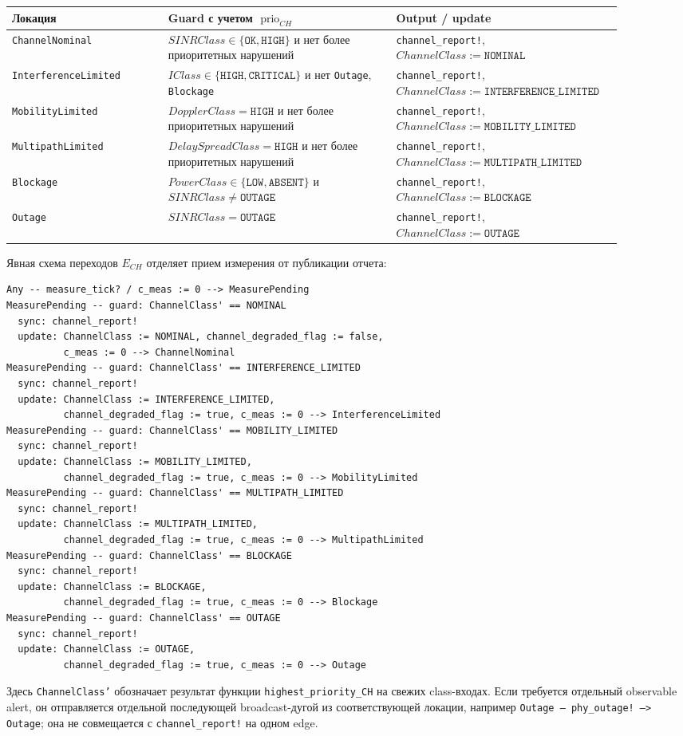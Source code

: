 \documentclass[10pt,a4paper]{article}
\newcommand{\code}[1]{\texttt{#1}}
\newcommand{\prio}{\operatorname{prio}}
\begin{document}
\begin{longtable}{|p{0.24\linewidth}|p{0.35\linewidth}|p{0.30\linewidth}|}
\hline
Локация & Guard с учетом \(\prio_{CH}\) & Output / update \\
\hline
\code{ChannelNominal} & \(SINRClass\in\{\code{OK},\code{HIGH}\}\) и нет более приоритетных нарушений & \code{channel\_report!}, \(ChannelClass:=\code{NOMINAL}\) \\
\hline
\code{InterferenceLimited} & \(IClass\in\{\code{HIGH},\code{CRITICAL}\}\) и нет \code{Outage}, \code{Blockage} & \code{channel\_report!}, \(ChannelClass:=\code{INTERFERENCE\_LIMITED}\) \\
\hline
\code{MobilityLimited} & \(DopplerClass=\code{HIGH}\) и нет более приоритетных нарушений & \code{channel\_report!}, \(ChannelClass:=\code{MOBILITY\_LIMITED}\) \\
\hline
\code{MultipathLimited} & \(DelaySpreadClass=\code{HIGH}\) и нет более приоритетных нарушений & \code{channel\_report!}, \(ChannelClass:=\code{MULTIPATH\_LIMITED}\) \\
\hline
\code{Blockage} & \(PowerClass\in\{\code{LOW},\code{ABSENT}\}\) и \(SINRClass\ne\code{OUTAGE}\) & \code{channel\_report!}, \(ChannelClass:=\code{BLOCKAGE}\) \\
\hline
\code{Outage} & \(SINRClass=\code{OUTAGE}\) & \code{channel\_report!}, \(ChannelClass:=\code{OUTAGE}\) \\
\hline
\end{longtable}

Явная схема переходов \(E_{CH}\) отделяет прием измерения от публикации отчета:
\begin{verbatim}
Any -- measure_tick? / c_meas := 0 --> MeasurePending
MeasurePending -- guard: ChannelClass' == NOMINAL
  sync: channel_report!
  update: ChannelClass := NOMINAL, channel_degraded_flag := false,
          c_meas := 0 --> ChannelNominal
MeasurePending -- guard: ChannelClass' == INTERFERENCE_LIMITED
  sync: channel_report!
  update: ChannelClass := INTERFERENCE_LIMITED,
          channel_degraded_flag := true, c_meas := 0 --> InterferenceLimited
MeasurePending -- guard: ChannelClass' == MOBILITY_LIMITED
  sync: channel_report!
  update: ChannelClass := MOBILITY_LIMITED,
          channel_degraded_flag := true, c_meas := 0 --> MobilityLimited
MeasurePending -- guard: ChannelClass' == MULTIPATH_LIMITED
  sync: channel_report!
  update: ChannelClass := MULTIPATH_LIMITED,
          channel_degraded_flag := true, c_meas := 0 --> MultipathLimited
MeasurePending -- guard: ChannelClass' == BLOCKAGE
  sync: channel_report!
  update: ChannelClass := BLOCKAGE,
          channel_degraded_flag := true, c_meas := 0 --> Blockage
MeasurePending -- guard: ChannelClass' == OUTAGE
  sync: channel_report!
  update: ChannelClass := OUTAGE,
          channel_degraded_flag := true, c_meas := 0 --> Outage
\end{verbatim}
Здесь \code{ChannelClass'} обозначает результат функции \code{highest\_priority\_CH} на свежих class-входах. Если требуется отдельный observable alert, он отправляется отдельной последующей broadcast-дугой из соответствующей локации, например \code{Outage -- phy\_outage! --> Outage}; она не совмещается с \code{channel\_report!} на одном edge.
\end{document}
